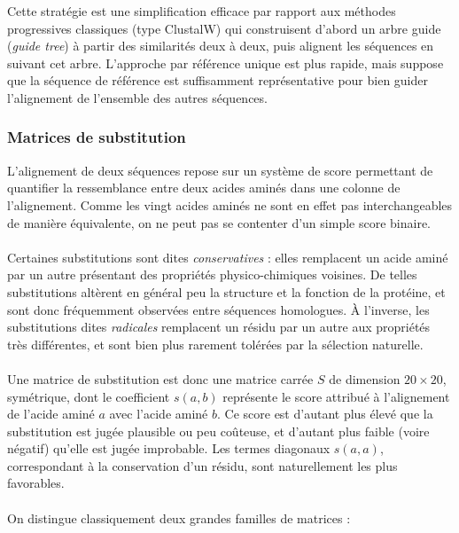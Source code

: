 \documentclass[11pt,a4paper]{article}
\begin{document}
\vspace{1cm}
Cette stratégie est une simplification efficace par rapport aux méthodes progressives classiques (type ClustalW) qui construisent d'abord un arbre guide (\emph{guide tree}) à partir des similarités deux à deux, puis alignent les séquences en suivant cet arbre. L'approche par référence unique est plus rapide, mais suppose que la séquence de référence est suffisamment représentative pour bien guider l'alignement de l'ensemble des autres séquences.
 
\subsubsection{Matrices de substitution}

L'alignement de deux séquences repose sur un système de score permettant de quantifier
la ressemblance entre deux acides aminés dans une colonne de l'alignement.
Comme les vingt acides aminés ne sont en effet pas interchangeables de manière
équivalente, on ne peut pas se contenter d'un simple score binaire.
\\
\\
Certaines substitutions sont dites \emph{conservatives} : elles remplacent un acide aminé
par un autre présentant des propriétés physico-chimiques voisines. De telles substitutions
altèrent en général peu la structure et la fonction de la protéine, et sont donc fréquemment
observées entre séquences homologues. À l'inverse, les substitutions dites \emph{radicales}
remplacent un résidu par un autre aux propriétés très différentes,
et sont bien plus rarement tolérées par la sélection naturelle.
\\
\\
Une matrice de substitution est donc une matrice carrée $S$ de dimension $20 \times 20$,
symétrique, dont le coefficient $s(a,b)$ représente le score attribué à l'alignement de
l'acide aminé $a$ avec l'acide aminé $b$. Ce score est d'autant plus élevé que la
substitution est jugée plausible ou peu coûteuse, et d'autant plus faible (voire négatif)
qu'elle est jugée improbable. Les termes diagonaux $s(a,a)$, correspondant à la conservation
d'un résidu, sont naturellement les plus favorables.
\\
\\
On distingue classiquement deux grandes familles de matrices :
\end{document}
